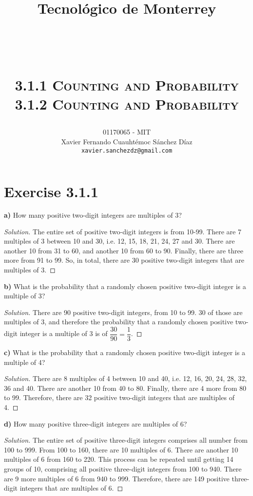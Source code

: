 \documentclass[titlepage, letterpaper, fleqn]{article}
\title{
\vspace{1in}
\textbf{Tecnológico de Monterrey} \\
\vspace{0.5in}
\textmd{\mahclass} \\
\large{\textit{\mahteacher}} \\
\vspace{0.5in}
\textsc{\mahtitle}\\
\textsc{3.1.1 Counting and Probability}\\
\textsc{3.1.2 Counting and Probability}\\
\author{01170065  - MIT \\
Xavier Fernando Cuauhtémoc Sánchez Díaz \\
\texttt{xavier.sanchezdz@gmail.com}}
\date{\mahdate}
}
\newcommand{\spacepls}{\vspace{5mm}}
\renewcommand\qedsymbol{\(\blacksquare\)}
\newenvironment{solution}
{\renewcommand\qedsymbol{$\square$}\begin{proof}[Solution]}
{\end{proof}}
\begin{document}
\begin{titlepage}
\maketitle
\end{titlepage}

%
%

\section{Exercise 3.1.1}

{\large \textbf{a)} How many positive two-digit integers are multiples of 3?}

\begin{solution}
The entire set of positive two-digit integers is from 10-99.
There are 7 multiples of 3 between 10 and 30, i.e. 12, 15, 18, 21, 24, 27 and 30.
There are another 10 from 31 to 60, and another 10 from 60 to 90.
Finally, there are three more from 91 to 99.
So, in total, there are 30 positive two-digit integers that are multiples of 3.
\end{solution}

\spacepls

{\large \textbf{b)} What is the probability that a randomly chosen positive two-digit integer is a multiple of 3?}

\begin{solution}
There are 90 positive two-digit integers, from 10 to 99.
30 of those are multiples of 3, and therefore the probability that a randomly chosen positive two-digit integer is a multiple of 3 is of \(\dfrac{30}{90} = \dfrac{1}{3}\).
\end{solution}

{\large \textbf{c)} What is the probability that a randomly chosen positive two-digit integer is a multiple of 4?}

\begin{solution}
There are 8 multiples of 4 between 10 and 40, i.e. 12, 16, 20, 24, 28, 32, 36 and 40.
There are another 10 from 40 to 80.
Finally, there are 4 more from 80 to 99.
Therefore, there are 32 positive two-digit integers that are multiples of 4.
\end{solution}

\spacepls

{\large \textbf{d)} How many positive three-digit integers are multiples of 6?}

\begin{solution}
The entire set of positive three-digit integers comprises all number from 100 to 999.
From 100 to 160, there are 10 multiples of 6.
There are another 10 multiples of 6 from 160 to 220.
This process can be repeated until getting 14 groups of 10, comprising all positive three-digit integers from 100 to 940.
There are 9 more multiples of 6 from 940 to 999.
Therefore, there are 149 positive three-digit integers that are multiples of 6.
\end{solution}
\end{document}
